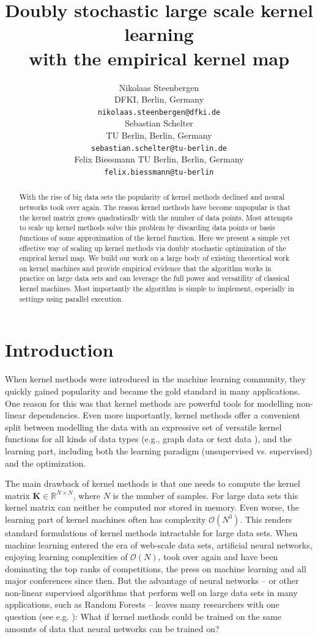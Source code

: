 \documentclass{article} %
\title{Doubly stochastic large scale kernel learning \\ with the empirical kernel map}
\author{
Nikolaas Steenbergen\\
DFKI, Berlin, Germany\\
\texttt{nikolaas.steenbergen@dfki.de}\\
\And
Sebastian Schelter\\
TU Berlin, Berlin, Germany\\
\texttt{sebastian.schelter@tu-berlin.de}\\
\And
Felix Biessmann
TU Berlin, Berlin, Germany\\
\texttt{felix.biessmann@tu-berlin}\\
}
\newcommand{\R}{\ensuremath{\mathds{R}}}
\renewcommand{\vec}[1]{\mathbf{#1}}
\begin{document}
\maketitle

\begin{abstract} 
With the rise of big data sets the popularity of kernel methods declined and neural networks took over again. The reason kernel methods have become unpopular is that the kernel matrix grows quadratically with the number of data points. Most attempts to scale up kernel methods  solve this problem by discarding data points or basis functions of some approximation of the kernel function. Here we present a simple yet effective way of scaling up kernel methods via doubly stochastic optimization of the emprical kernel map. We build our work on a large body of existing theoretical work on kernel machines and provide empirical evidence that the algorithm works in practice on large data sets and can leverage the full power and versatility of classical kernel machines. Most importantly the algorithm is simple to implement, especially in settings using parallel execution.
\end{abstract} 


\section{Introduction\vspace{-0.1in}}
\indent When kernel methods \cite{Muller:2001p2592,learning_with_kernels,shawe2004kernel} were introduced in the machine learning community, they quickly gained popularity and became the gold standard in many applications. One reason for this was that kernel methods are powerful tools for modelling non-linear dependencies. Even more importantly, kernel methods offer a convenient split between modelling the data with an expressive set of versatile kernel functions for all kinds of data types (e.g., graph data \cite{shawe2004kernel} or text data \cite{John2000}), and the learning part, including both the learning paradigm (unsupervised vs. supervised) and the optimization. 

The main drawback of kernel methods is that one needs to compute the kernel matrix $\vec{K}\in\R^{N\times N}$, where $N$ is the number of samples. For large data sets this kernel matrix can neither be computed nor stored in memory. Even worse, the learning part of kernel machines often has complexity $\mathcal{O}(N^3)$. This renders standard formulations of kernel methods intractable for large data sets. When machine learning entered the era of web-scale data sets, artificial neural networks, enjoying learning complexities of $\mathcal{O}(N)$, took over again and have been dominating the top ranks of competitions, the press on machine learning and all major conferences since then. But the advantage of neural networks -- or other non-linear supervised algorithms that perform well on large data sets in many applications, such as Random Forests \cite{Breiman2001} -- leaves many researchers with one question (see e.g. \cite{Lu2014}): What if kernel methods could be trained on the same amounts of data that neural networks can be trained on? 
\end{document}
